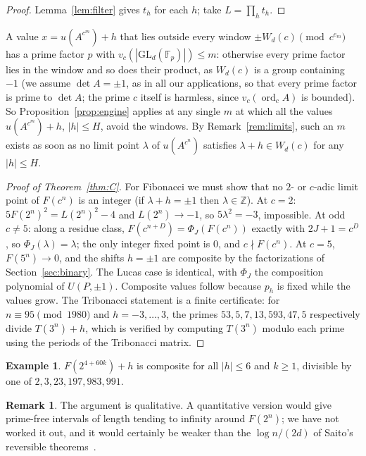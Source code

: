 \documentclass[11pt]{amsart}
\theoremstyle{definition}
\newtheorem{remark}[theorem]{Remark}
\newtheorem{example}[theorem]{Example}
\newcommand{\Z}{\mathbb{Z}}
\newcommand{\F}{\mathbb{F}}
\newcommand{\GL}{\mathrm{GL}}
\newcommand{\ord}{\operatorname{ord}}
\begin{document}
\begin{proof}
Lemma~\ref{lem:filter} gives $t_h$ for each $h$; take $L=\prod_h t_h$.
\end{proof}

A value $x=u(A^{c^m})+h$ that lies outside every window $\pm W_d(c)\pmod{c^{e_m}}$ has a prime factor $p$ with $v_c(|\GL_d(\F_p)|)\le m$: otherwise every prime factor lies in the window and so does their product, as $W_d(c)$ is a group containing $-1$ (we assume $\det A=\pm1$, as in all our applications, so that every prime factor is prime to $\det A$; the prime $c$ itself is harmless, since $v_c(\ord_cA)$ is bounded).  So Proposition~\ref{prop:engine} applies at any single $m$ at which all the values $u(A^{c^m})+h$, $|h|\le H$, avoid the windows.  By Remark~\ref{rem:limits}, such an $m$ exists as soon as no limit point $\lambda$ of $u(A^{c^n})$ satisfies $\lambda+h\in W_d(c)$ for any $|h|\le H$.

\begin{proof}[Proof of Theorem~\ref{thm:C}]
For Fibonacci we must show that no $2$- or $c$-adic limit point of $F(c^n)$ is an integer (if $\lambda+h=\pm1$ then $\lambda\in\Z$).  At $c=2$: $5F(2^n)^2=L(2^n)^2-4$ and $L(2^n)\to-1$, so $5\lambda^2=-3$, impossible.  At odd $c\neq5$: along a residue class, $F(c^{n+D})=\Phi_J(F(c^n))$ exactly with $2J+1=c^D$, so $\Phi_J(\lambda)=\lambda$; the only integer fixed point is $0$, and $c\nmid F(c^n)$.  At $c=5$, $F(5^n)\to0$, and the shifts $h=\pm1$ are composite by the factorizations of Section~\ref{sec:binary}.  The Lucas case is identical, with $\Phi_J$ the composition polynomial of $U(P,\pm1)$.  Composite values follow because $p_h$ is fixed while the values grow.  The Tribonacci statement is a finite certificate: for $n\equiv95\pmod{1980}$ and $h=-3,\dots,3$, the primes $53,5,7,13,593,47,5$ respectively divide $T(3^n)+h$, which is verified by computing $T(3^n)$ modulo each prime using the periods of the Tribonacci matrix.
\end{proof}

\begin{example}
$F(2^{4+60k})+h$ is composite for all $|h|\le6$ and $k\ge1$, divisible by one of $2,3,23,197,983,991$.
\end{example}

\begin{remark}
The argument is qualitative.  A quantitative version would give prime-free intervals of length tending to infinity around $F(2^n)$; we have not worked it out, and it would certainly be weaker than the $\log n/(2d)$ of Saito's reversible theorems~\cite{Sai25a}.
\end{remark}
\end{document}

